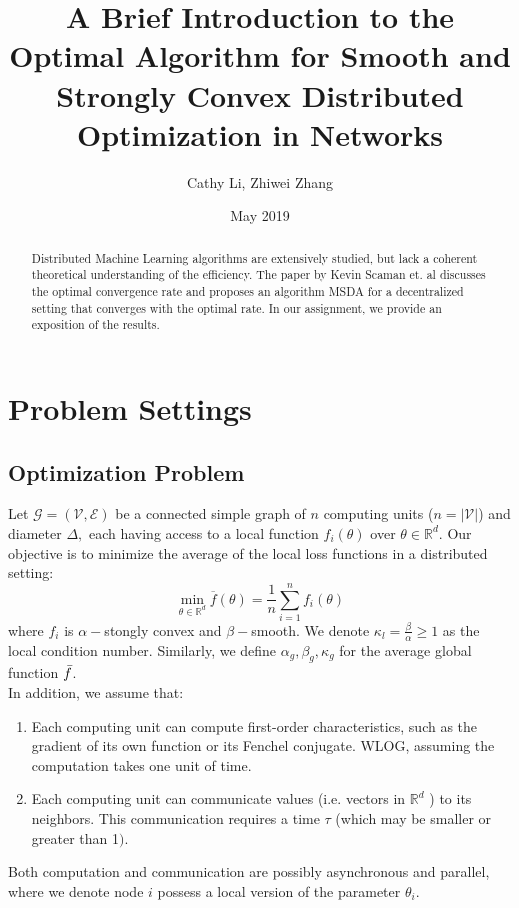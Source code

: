 \documentclass[12pt]{article}
\title{A Brief Introduction to the Optimal Algorithm for Smooth and Strongly Convex Distributed Optimization in Networks}
\author{Cathy Li, Zhiwei Zhang}
\date{May 2019}
\begin{document}
\maketitle
\begin{abstract}
    Distributed Machine Learning algorithms are extensively studied, but lack a coherent theoretical understanding of the efficiency. The paper by Kevin Scaman et. al discusses the optimal convergence rate and proposes an algorithm MSDA for a decentralized setting that converges with the optimal rate. In our assignment, we provide an exposition of the results. 
\end{abstract}
\section{Problem Settings}
\subsection{Optimization Problem}
Let $\mathcal { G } = ( \mathcal { V } , \mathcal { E } )$ be a connected simple  graph of $n$ computing units ($n = |\mathcal{V}|$) and diameter
$\Delta ,$ each having access to a local function $f _ { i } ( \theta )$ over $\theta \in \mathbb { R } ^ { d } .$ Our objective is to minimize the average of the local loss functions in a distributed setting: 
$$
\min _ { \theta \in \mathbb { R } ^ { d } } \overline { f } ( \theta ) = \frac { 1 } { n } \sum _ { i = 1 } ^ { n } f _ { i } ( \theta )
$$
where $f_i$ is $\alpha-$stongly convex and $\beta-$smooth. We denote $\kappa _ { l } = \frac { \beta } { \alpha } \geq 1$ as the local condition number. Similarly, we define $\alpha_g, \beta_g, \kappa_g$ for the average global function $\Bar{f}$.\\
\newline 
In addition, we assume that: 
\begin{enumerate}
    \item Each computing unit can compute first-order characteristics, such as the gradient of its own function or its Fenchel conjugate. WLOG, assuming the computation takes one unit of time.
    \item Each computing unit can communicate values (i.e. vectors in $\mathbb { R } ^ { d }$ ) to its neighbors. This communication requires a time $\tau$ (which may be smaller or greater than 1$) .$
\end{enumerate}
Both computation and communication are possibly asynchronous and parallel, where we denote node $i$ possess a local version of the parameter $\theta_i$. \\
\end{document}
